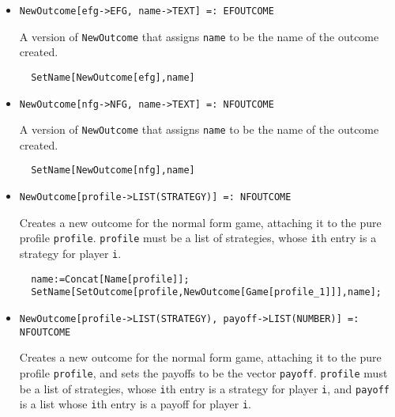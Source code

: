 \begin{itemize}
\item{}
\protect \large \begin{verbatim}
NewOutcome[efg->EFG, name->TEXT] =: EFOUTCOME 
\end{verbatim}\normalsize

\bd 
A version of \verb+NewOutcome+ that assigns \verb+name+ to be the name
of the outcome created.  
\begin{verbatim}
  SetName[NewOutcome[efg],name]
\end{verbatim} 
\ed

\item{}
\protect \large \begin{verbatim}
NewOutcome[nfg->NFG, name->TEXT] =: NFOUTCOME 
\end{verbatim}\normalsize

\bd 
A version of \verb+NewOutcome+ that assigns \verb+name+ to be the name
of the outcome created.  
\begin{verbatim}
  SetName[NewOutcome[nfg],name]
\end{verbatim} 
\ed

\item{}
\protect \large \begin{verbatim}
NewOutcome[profile->LIST(STRATEGY)] =: NFOUTCOME 
\end{verbatim}\normalsize

\bd 
Creates a new outcome for the normal form game, attaching it to
the pure profile \verb+profile+.  \verb+profile+ must be a list of
strategies, whose \verb+i+th entry is a strategy for player \verb+i+. 


\begin{verbatim}
  name:=Concat[Name[profile]];
  SetName[SetOutcome[profile,NewOutcome[Game[profile_1]]],name];
\end{verbatim} 
\ed

\item{}
\protect \large \begin{verbatim}
NewOutcome[profile->LIST(STRATEGY), payoff->LIST(NUMBER)] =: NFOUTCOME 
\end{verbatim}\normalsize
 
\bd 
Creates a new outcome for the normal form game, attaching it to
the pure profile \verb+profile+, and sets the payoffs to be the vector
\verb+payoff+.  \verb+profile+ must be a list of strategies, whose
\verb+i+th entry is a strategy for player \verb+i+, and \verb+payoff+
is a list whose \verb+i+th entry is a payoff for player \verb+i+.


\end{itemize}

